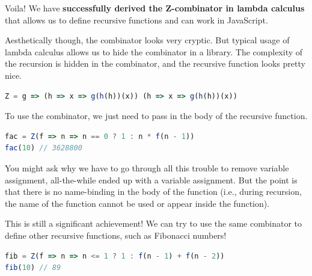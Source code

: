 \documentclass[12pt]{article}
\begin{document}
Voila!
We have \textbf{successfully derived the Z-combinator in lambda calculus} that allows us to define recursive functions and can work in JavaScript.

Aesthetically though, the combinator looks very cryptic.
But typical usage of lambda calculus allows us to hide the combinator in a library.
The complexity of the recursion is hidden in the combinator, and the recursive function looks pretty nice.

\begin{lstlisting}[frame=single,language=javascript,basicstyle=\ttfamily]
Z = g => (h => x => g(h(h))(x)) (h => x => g(h(h))(x))
\end{lstlisting}

To use the combinator, we just need to pass in the body of the recursive function.

\begin{lstlisting}[frame=single,language=javascript,basicstyle=\ttfamily]
fac = Z(f => n => n == 0 ? 1 : n * f(n - 1))
fac(10) // 3628800
\end{lstlisting}

You might ask why we have to go through all this trouble to remove variable assignment, all-the-while ended up with a variable assignment.
But the point is that there is no name-binding in the body of the function (i.e., during recursion, the name of the function cannot be used or appear inside the function).

This is still a significant achievement!
We can try to use the same combinator to define other recursive functions, such as Fibonacci numbers!

\begin{lstlisting}[frame=single,language=javascript,basicstyle=\ttfamily]
fib = Z(f => n => n <= 1 ? 1 : f(n - 1) + f(n - 2))
fib(10) // 89
\end{lstlisting}

\end{document}
